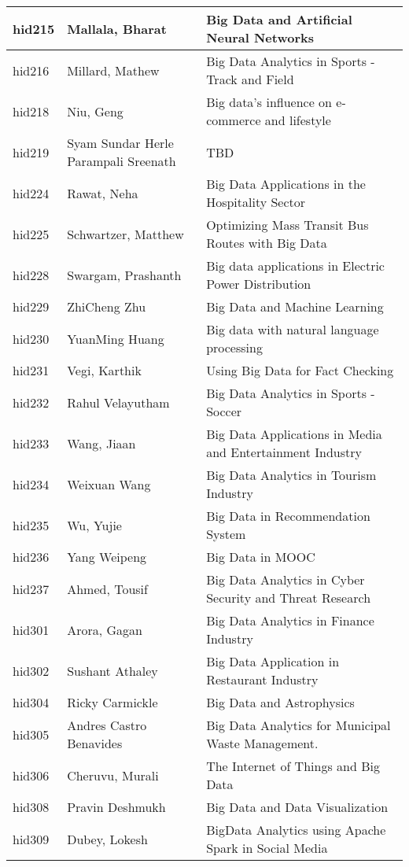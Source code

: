 \documentclass[12pt]{book}
\begin{document}
\begin{footnotesize}
\begin{longtable}{|p{1cm}p{5cm}p{9cm}|}
\hline
hid215 & Mallala, Bharat & Big Data and Artificial Neural Networks  \\
\hline
hid216 & Millard, Mathew & Big Data Analytics in Sports - Track and Field  \\
\hline
hid218 & Niu, Geng & Big data's influence on e-commerce and lifestyle  \\
\hline
hid219 & Syam Sundar Herle Parampali Sreenath & TBD  \\
\hline
hid224 & Rawat, Neha & Big Data Applications in the Hospitality Sector  \\
\hline
hid225 & Schwartzer, Matthew & Optimizing Mass Transit Bus Routes with Big Data  \\
\hline
hid228 & Swargam, Prashanth & Big data applications in Electric Power Distribution  \\
\hline
hid229 & ZhiCheng Zhu & Big Data and Machine Learning  \\
\hline
hid230 & YuanMing Huang & Big data with natural language processing  \\
\hline
hid231 & Vegi, Karthik & Using Big Data for Fact Checking  \\
\hline
hid232 & Rahul Velayutham & Big Data Analytics in Sports - Soccer  \\
\hline
hid233 & Wang, Jiaan & Big Data Applications in Media and Entertainment Industry  \\
\hline
hid234 & Weixuan Wang & Big Data Analytics in Tourism Industry  \\
\hline
hid235 & Wu, Yujie & Big Data in Recommendation System  \\
\hline
hid236 & Yang Weipeng & Big Data in MOOC  \\
\hline
hid237 & Ahmed, Tousif & Big Data Analytics in Cyber Security and Threat Research  \\
\hline
hid301 & Arora, Gagan & Big Data Analytics in Finance Industry  \\
\hline
hid302 & Sushant Athaley & Big Data Application in Restaurant Industry  \\
\hline
hid304 & Ricky Carmickle & Big Data and Astrophysics  \\
\hline
hid305 & Andres Castro Benavides & Big Data Analytics for Municipal Waste Management.  \\
\hline
hid306 & Cheruvu, Murali & The Internet of Things and Big Data  \\
\hline
hid308 & Pravin Deshmukh & Big Data and Data Visualization  \\
\hline
hid309 & Dubey, Lokesh & BigData Analytics using Apache Spark in Social Media  \\

\end{longtable}
\end{footnotesize}
\end{document}
